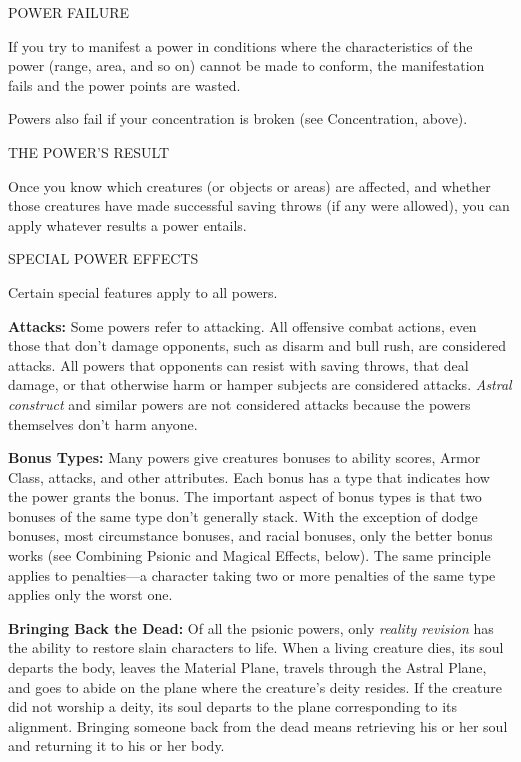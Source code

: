 \documentclass{article}
\begin{document}
\vspace{12pt}
POWER FAILURE

If you try to manifest a power in conditions where the characteristics of the power 
(range, area, and so on) cannot be made to conform, the manifestation fails and 
the power points are wasted. 

Powers also fail if your concentration is broken (see Concentration, above).

\vspace{12pt}
THE POWER'S RESULT

Once you know which creatures (or objects or areas) are affected, and whether those 
creatures have made successful saving throws (if any were allowed), you can apply 
whatever results a power entails.

\vspace{12pt}
SPECIAL POWER EFFECTS

Certain special features apply to all powers.

\textbf{Attacks:} Some powers refer to attacking. All offensive combat actions, 
even those that don't damage opponents, such as disarm and bull rush, are considered 
attacks. All powers that opponents can resist with saving throws, that deal damage, 
or that otherwise harm or hamper subjects are considered attacks. \textit{Astral 
construct }and similar powers are not considered attacks because the powers themselves 
don't harm anyone.

\textbf{Bonus Types:} Many powers give creatures bonuses to ability scores, Armor 
Class, attacks, and other attributes. Each bonus has a type that indicates how 
the power grants the bonus. The important aspect of bonus types is that two bonuses 
of the same type don't generally stack. With the exception of dodge bonuses, most 
circumstance bonuses, and racial bonuses, only the better bonus works (see Combining 
Psionic and Magical Effects, below). The same principle applies to penalties---a 
character taking two or more penalties of the same type applies only the worst 
one.

\textbf{Bringing Back the Dead:} Of all the psionic powers, only \textit{reality 
revision }has the ability to restore slain characters to life. When a living creature 
dies, its soul departs the body, leaves the Material Plane, travels through the 
Astral Plane, and goes to abide on the plane where the creature's deity resides. 
If the creature did not worship a deity, its soul departs to the plane corresponding 
to its alignment. Bringing someone back from the dead means retrieving his or her 
soul and returning it to his or her body.
\end{document}
